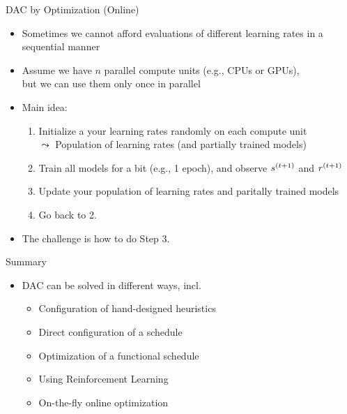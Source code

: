 \begin{frame}[c,fragile]{DAC by Optimization (Online)}
	
	
	\begin{itemize}
	    \item Sometimes we cannot afford evaluations of different learning rates in a sequential manner
	    \item Assume we have $n$ parallel compute units (e.g., CPUs or GPUs),\\ but we can use them only once in parallel
	    \item Main idea: 
	    \begin{enumerate}
	        \item Initialize a your learning rates randomly on each compute unit\\
	        $\leadsto$ Population of learning rates (and partially trained models)
	        \item Train all models for a bit (e.g., 1 epoch), and observe $s^{(t+1)}$ and $r^{(t+1)}$
	        \item Update your population of learning rates and paritally trained models
	        \item Go back to 2.
	    \end{enumerate}
	    \item The challenge is how to do Step 3.
	    
	\end{itemize}
	
\end{frame}
\begin{frame}[c,fragile]{Summary}
	
	
	\begin{itemize}
	    \item DAC can be solved in different ways, incl.
	    \begin{itemize}
	        \item Configuration of hand-designed heuristics
	        \item Direct configuration of a schedule
	        \item Optimization of a functional schedule
	        \item Using Reinforcement Learning
	        \item On-the-fly online optimization
	    \end{itemize}
	    
	\end{itemize}
	
\end{frame}

